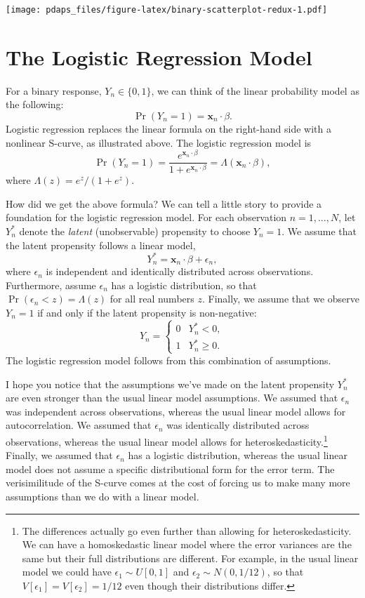 \documentclass[12pt,oneside,openany]{book}
\begin{document}
\texttt{[image: pdaps\_files/figure-latex/binary-scatterplot-redux-1.pdf]}

\section{The Logistic Regression
Model}\label{the-logistic-regression-model}

For a binary response, \(Y_n \in \{0, 1\}\), we can think of the linear
probability model as the following: \[
\Pr(Y_n = 1) = \mathbf{x}_n \cdot \beta.
\] Logistic regression replaces the linear formula on the right-hand
side with a nonlinear S-curve, as illustrated above. The logistic
regression model is \[
\Pr(Y_n = 1) = \frac{e^{\mathbf{x}_n \cdot \beta}}{1 + e^{\mathbf{x}_n \cdot \beta}} = \Lambda(\mathbf{x}_n \cdot \beta),
\] where \(\Lambda(z) = e^z / (1 + e^z)\).

How did we get the above formula? We can tell a little story to provide
a foundation for the logistic regression model. For each observation
\(n = 1, \ldots, N\), let \(Y_n^*\) denote the \emph{latent}
(unobservable) propensity to choose \(Y_n = 1\). We assume that the
latent propensity follows a linear model, \[
Y_n^* = \mathbf{x}_n \cdot \beta + \epsilon_n,
\] where \(\epsilon_n\) is independent and identically distributed
across observations. Furthermore, assume \(\epsilon_n\) has a logistic
distribution, so that \(\Pr(\epsilon_n < z) = \Lambda(z)\) for all real
numbers \(z\). Finally, we assume that we observe \(Y_n = 1\) if and
only if the latent propensity is non-negative: \[
Y_n = \begin{cases}
0 & Y_n^* < 0, \\
1 & Y_n^* \geq 0.
\end{cases}
\] The logistic regression model follows from this combination of
assumptions.

I hope you notice that the assumptions we've made on the latent
propensity \(Y_n^*\) are even stronger than the usual linear model
assumptions. We assumed that \(\epsilon_n\) was independent across
observations, whereas the usual linear model allows for autocorrelation.
We assumed that \(\epsilon_n\) was identically distributed across
observations, whereas the usual linear model allows for
heteroskedasticity.\footnote{The differences actually go even further
  than allowing for heteroskedasticity. We can have a homoskedastic
  linear model where the error variances are the same but their full
  distributions are different. For example, in the usual linear model we
  could have \(\epsilon_1 \sim U[0, 1]\) and
  \(\epsilon_2 \sim N(0, 1/12)\), so that
  \(V[\epsilon_1] = V[\epsilon_2] = 1/12\) even though their
  distributions differ.} Finally, we assumed that \(\epsilon_n\) has a
logistic distribution, whereas the usual linear model does not assume a
specific distributional form for the error term. The verisimilitude of
the S-curve comes at the cost of forcing us to make many more
assumptions than we do with a linear model.
\end{document}
